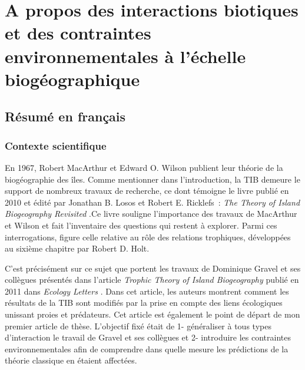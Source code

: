 \chapter{A propos des interactions biotiques et des contraintes environnementales à l'échelle biogéographique}
\label{chap1}

\section{Résumé en français}
%
\subsection{Contexte scientifique}

En 1967, Robert MacArthur et Edward O. Wilson publient leur théorie de la
biogéographie des îles. Comme mentionner dans l'introduction, la TIB demeure le
support de nombreux travaux de recherche, ce dont témoigne le livre publié en
2010 et édité par Jonathan B. Losos et Robert E. Ricklefs~: \emph{The Theory of
Island Biogeography Revisited} \citep{Losos2010}.Ce livre souligne l'importance
des travaux de MacArthur et Wilson et fait l'inventaire des questions qui
restent à explorer. Parmi ces interrogations, figure celle relative au rôle
des relations trophiques, développées au sixième chapitre par Robert D. Holt.

C'est précisément sur ce sujet que portent les travaux de Dominique Gravel et
ses collègues présentés dans l'article \emph{Trophic Theory of Island
Biogeography} publié en 2011 dans \emph{Ecology Letters} \citep{Gravel2011}.
Dans cet article, les auteurs montrent comment les résultats de la TIB sont
modifiés par la prise en compte des liens écologiques unissant proies et
prédateurs. Cet article est également le point de départ de mon premier article
de thèse. L'objectif fixé était de 1- généraliser à tous types d'interaction le
travail de Gravel et ses collègues et 2- introduire les contraintes
environnementales afin de comprendre dans quelle mesure les prédictions de la
théorie classique en étaient affectées.


